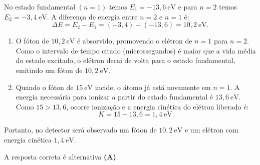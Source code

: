 \begin{flushleft}
No estado fundamental $(n=1)$ temos $E_1=-13{,}6\ \mathrm{eV}$ e para $n=2$ temos $E_2=-3{,}4\ \mathrm{eV}$. A diferença de energia entre $n=2$ e $n=1$ é:
\[
\Delta E=E_2-E_1=(-3{,}4)-(-13{,}6)=10{,}2\ \mathrm{eV}.
\]

\begin{enumerate}
\item O fóton de $10{,}2\ \mathrm{eV}$ é absorvido, promovendo o elétron de $n=1$ para $n=2$. Como o intervalo de tempo citado (microssegundos) é maior que a vida média do estado excitado, o elétron decai de volta para o estado fundamental, emitindo um fóton de $10{,}2\ \mathrm{eV}$.
\item Quando o fóton de $15\ \mathrm{eV}$ incide, o átomo já está novamente em $n=1$. A energia necessária para ionizar a partir do estado fundamental é $13{,}6\ \mathrm{eV}$. Como $15>13{,}6$, ocorre ionização e a energia cinética do elétron liberado é:
\[
K=15-13{,}6=1{,}4\ \mathrm{eV}.
\]
\end{enumerate}

Portanto, no detector será observado um fóton de $10{,}2\ \mathrm{eV}$ e um elétron com energia cinética $1{,}4\ \mathrm{eV}$.

A resposta correta é alternativa \colorbox{green!50}{\textbf{(A)}}.

\end{flushleft}

